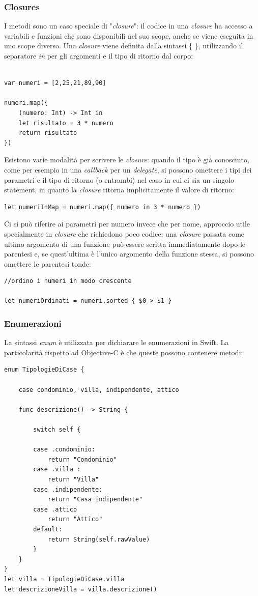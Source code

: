 \subsubsection{Closures}
I metodi sono un caso speciale di "\textit{closure}": il codice in una \textit{closure} ha accesso a variabili e funzioni che sono disponibili nel suo scope, anche se viene eseguita in uno scope diverso. Una \textit{closure} viene definita dalla sintassi \{ \}, utilizzando il separatore \textit{in} per gli argomenti e il tipo di ritorno dal corpo:\\\\ 
\lstset{language=[Objective]C, breakindent=40pt, breaklines}
\begin{lstlisting}
var numeri = [2,25,21,89,90]

numeri.map({
	(numero: Int) -> Int in 
	let risultato = 3 * numero 
	return risultato 
})
\end{lstlisting}
Esistono varie modalità per scrivere le \textit{closure}: quando il tipo è già conosciuto, come per esempio in una \textit{callback} per un \textit{delegate}, si possono omettere i tipi dei parametri e il tipo di ritorno (o entrambi) nel caso in cui ci sia un singolo statement, in quanto la \textit{closure} ritorna implicitamente il valore di ritorno:
\lstset{language=[Objective]C, breakindent=40pt, breaklines}
\begin{lstlisting}
let numeriInMap = numeri.map({ numero in 3 * numero })
\end{lstlisting}
Ci si può riferire ai parametri per numero invece che per nome, approccio utile specialmente in \textit{closure} che richiedono poco codice; una \textit{closure} passata come ultimo argomento di una funzione può essere scritta immediatamente dopo le parentesi e, se quest'ultima è l'unico argomento della funzione stessa, si possono omettere le parentesi tonde: 
\lstset{language=[Objective]C, breakindent=40pt, breaklines}
\begin{lstlisting}
//ordino i numeri in modo crescente

let numeriOrdinati = numeri.sorted { $0 > $1 }
\end{lstlisting}
\subsubsection{Enumerazioni}
La sintassi \textit{enum} è utilizzata per dichiarare le enumerazioni in Swift. La particolarità rispetto ad Objective-C è che queste possono contenere metodi:
\lstset{language=[Objective]C, breakindent=40pt, breaklines}
\begin{lstlisting}
enum TipologieDiCase {

	case condominio, villa, indipendente, attico
	
	func descrizione() -> String {
	
		switch self {
	
		case .condominio:
			return "Condominio"
		case .villa :
			return "Villa"
		case .indipendente:
			return "Casa indipendente"
		case .attico
			return "Attico"
		default: 
			return String(self.rawValue)
		}
	}
}
let villa = TipologieDiCase.villa
let descrizioneVilla = villa.descrizione()
\end{lstlisting}
